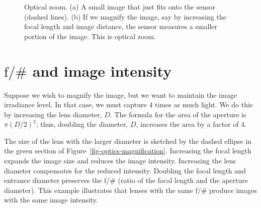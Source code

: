 \documentclass[
  letterpaper,
]{book}
\begin{document}
\begin{figure}


\caption{\label{fig-optics-zoom}Optical zoom. (a) A small image that
just fits onto the sensor (dashed lines). (b) If we magnify the image,
say by increasing the focal length and image distance, the sensor
measures a smaller portion of the image. This is optical zoom.}

\end{figure}%

\section{\texorpdfstring{\(\mathrm{f}/\#\) and image
intensity}{\textbackslash mathrm\{f\}/\textbackslash\# and image intensity}}\label{sec-optics-fnumberintensity}

Suppose we wish to magnify the image, but we want to maintain the image
irradiance level. In that case, we must capture \(4\) times as much
light. We do this by increasing the lens diameter, \(D\). The formula
for the area of the aperture is \(\pi (D/2)^2\); thus, doubling the
diameter, \(D\), increases the area by a factor of \(4\).

The size of the lens with the larger diameter is sketched by the dashed
ellipse in the green section of Figure~\ref{fig-optics-magnification}.
Increasing the focal length expands the image size and reduces the image
intensity. Increasing the lens diameter compensates for the reduced
intensity. Doubling the focal length and entrance diameter preserves the
f/\# (ratio of the focal length and the aperture diameter). This example
illustrates that lenses with the same f/\# produce images with the same
image intensity.
\end{document}

